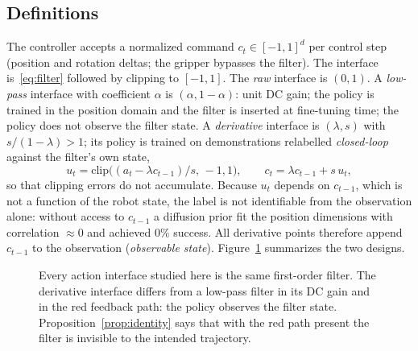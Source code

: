 \documentclass{article}
\begin{document}
\subsection{Definitions}

The controller accepts a normalized command $c_t\in[-1,1]^d$ per control step (position and rotation deltas; the gripper bypasses the filter). The interface is~\eqref{eq:filter} followed by clipping to $[-1,1]$. The \emph{raw} interface is $(0,1)$. A \emph{low-pass} interface with coefficient $\alpha$ is $(\alpha,1-\alpha)$: unit DC gain; the policy is trained in the position domain and the filter is inserted at fine-tuning time; the policy does not observe the filter state. A \emph{derivative} interface is $(\lambda,s)$ with $s/(1-\lambda)>1$; its policy is trained on demonstrations relabelled \emph{closed-loop} against the filter's own state,
\begin{equation}
u_t=\mathrm{clip}\!\big((a_t-\lambda c_{t-1})/s,\,-1,1\big),\qquad c_t=\lambda c_{t-1}+s\,u_t,
\label{eq:relabel}
\end{equation}
so that clipping errors do not accumulate. Because $u_t$ depends on $c_{t-1}$, which is not a function of the robot state, the label is not identifiable from the observation alone: without access to $c_{t-1}$ a diffusion prior fit the position dimensions with correlation $\approx0$ and achieved 0\% success. All derivative points therefore append $c_{t-1}$ to the observation (\emph{observable state}). Figure~\ref{fig:schematic} summarizes the two designs.

\begin{figure}[t]
\centering
{}
\caption{Every action interface studied here is the same first-order filter. The derivative interface differs from a low-pass filter in its DC gain and in the red feedback path: the policy observes the filter state. Proposition~\ref{prop:identity} says that with the red path present the filter is invisible to the intended trajectory.}
\label{fig:schematic}
\end{figure}
\end{document}
